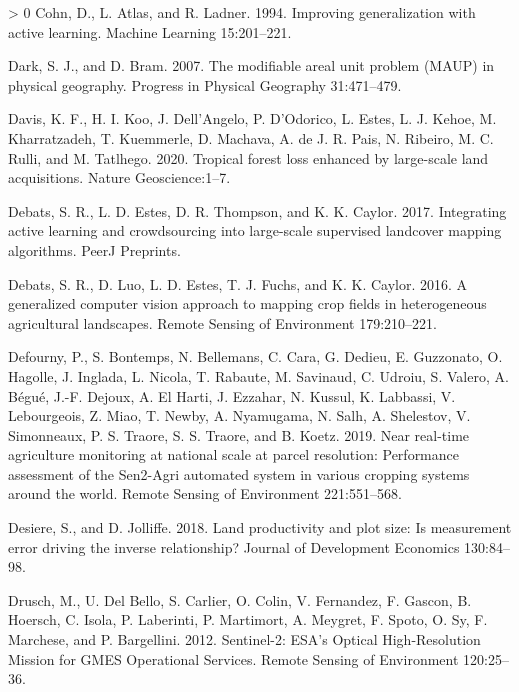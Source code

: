 \documentclass[11pt,a4paper]{article}
\newlength{\cslhangindent}
\newenvironment{CSLReferences}[3] %
 {%
  \setlength{\parindent}{0pt}
  \ifodd #1 \everypar{\setlength{\hangindent}{\cslhangindent}}\ignorespaces\fi
  \ifnum #2 > 0
  \setlength{\parskip}{#2\baselineskip}
  \fi
 }%
 {}
\begin{document}
\begin{CSLReferences}{1}{0}
\leavevmode\hypertarget{ref-cohnImprovingGeneralizationActive1994}{}%
Cohn, D., L. Atlas, and R. Ladner. 1994. Improving generalization with
active learning. Machine Learning 15:201--221.

\leavevmode\hypertarget{ref-Darkmodifiablearealunit2007}{}%
Dark, S. J., and D. Bram. 2007. The modifiable areal unit problem
({MAUP}) in physical geography. Progress in Physical Geography
31:471--479.

\leavevmode\hypertarget{ref-davisTropicalForestLoss2020}{}%
Davis, K. F., H. I. Koo, J. Dell'Angelo, P. D'Odorico, L. Estes, L. J.
Kehoe, M. Kharratzadeh, T. Kuemmerle, D. Machava, A. de J. R. Pais, N.
Ribeiro, M. C. Rulli, and M. Tatlhego. 2020. Tropical forest loss
enhanced by large-scale land acquisitions. Nature Geoscience:1--7.

\leavevmode\hypertarget{ref-DebatsIntegratingactivelearning2017}{}%
Debats, S. R., L. D. Estes, D. R. Thompson, and K. K. Caylor. 2017.
Integrating active learning and crowdsourcing into large-scale
supervised landcover mapping algorithms. {PeerJ Preprints}.

\leavevmode\hypertarget{ref-Debatsgeneralizedcomputervision2016}{}%
Debats, S. R., D. Luo, L. D. Estes, T. J. Fuchs, and K. K. Caylor. 2016.
A generalized computer vision approach to mapping crop fields in
heterogeneous agricultural landscapes. Remote Sensing of Environment
179:210--221.

\leavevmode\hypertarget{ref-Defournyrealtimeagriculturemonitoring2019}{}%
Defourny, P., S. Bontemps, N. Bellemans, C. Cara, G. Dedieu, E.
Guzzonato, O. Hagolle, J. Inglada, L. Nicola, T. Rabaute, M. Savinaud,
C. Udroiu, S. Valero, A. Bégué, J.-F. Dejoux, A. El Harti, J. Ezzahar,
N. Kussul, K. Labbassi, V. Lebourgeois, Z. Miao, T. Newby, A. Nyamugama,
N. Salh, A. Shelestov, V. Simonneaux, P. S. Traore, S. S. Traore, and B.
Koetz. 2019. Near real-time agriculture monitoring at national scale at
parcel resolution: {Performance} assessment of the {Sen2}-{Agri}
automated system in various cropping systems around the world. Remote
Sensing of Environment 221:551--568.

\leavevmode\hypertarget{ref-desiereLandProductivityPlot2018}{}%
Desiere, S., and D. Jolliffe. 2018. Land productivity and plot size:
{Is} measurement error driving the inverse relationship? Journal of
Development Economics 130:84--98.

\leavevmode\hypertarget{ref-DruschSentinel2ESAOptical2012}{}%
Drusch, M., U. Del Bello, S. Carlier, O. Colin, V. Fernandez, F. Gascon,
B. Hoersch, C. Isola, P. Laberinti, P. Martimort, A. Meygret, F. Spoto,
O. Sy, F. Marchese, and P. Bargellini. 2012. Sentinel-2: {ESA}'s
{Optical High}-{Resolution Mission} for {GMES Operational Services}.
Remote Sensing of Environment 120:25--36.


\end{CSLReferences}
\end{document}
